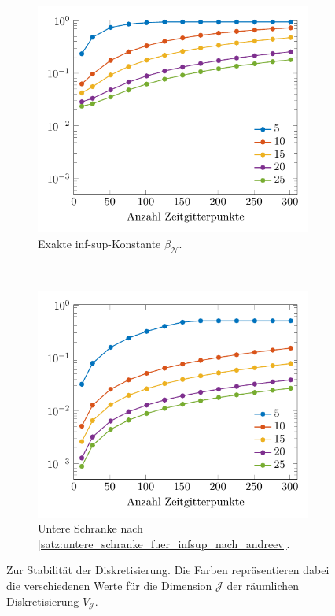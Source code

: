 \documentclass[../main.tex]{subfiles}
\begin{document}
\begin{figure}[tb]
    \centering
    \centering
    \begin{subfigure}[b]{0.485\textwidth}
        \centering
        \includegraphics[width=1\textwidth]{figures/chapter4/infsup_homogen_ein_feld_a.pdf}
        \caption{Exakte inf-sup-Konstante $\beta_{\mathcal N}$.}
    \end{subfigure}
    ~
    \begin{subfigure}[b]{0.485\textwidth}
        \centering
        \includegraphics[width=1\textwidth]{figures/chapter4/infsup_homogen_ein_feld_b.pdf}
        \caption{Untere Schranke nach \cref{satz:untere_schranke_fuer_infsup_nach_andreev}.}
    \end{subfigure}
    \caption[Stabilität der Diskretisierung mit homogenen Randbedingungen, erstes Beispiel.]{%
        Zur Stabilität der Diskretisierung.
        Die Farben repräsentieren dabei die verschiedenen Werte für die Dimension $\mathcal J$ der räumlichen Diskretisierung $V_{\mathcal J}$.
        }
    \label{figure:infsup_homogen_ein_feld}
\end{figure}
\end{document}
